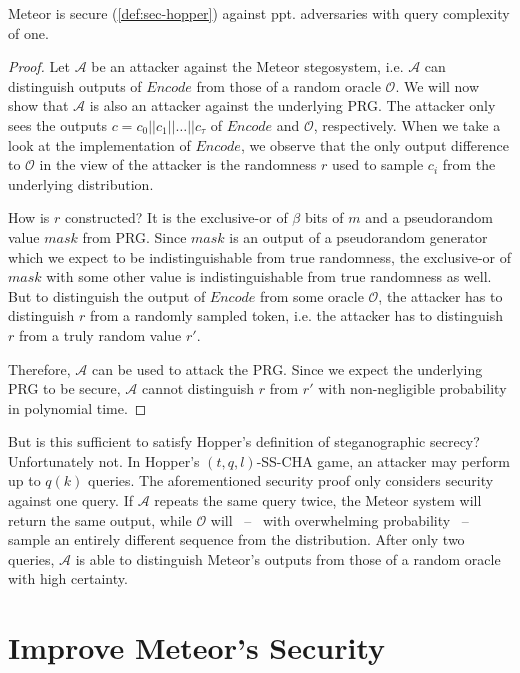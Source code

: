 \begin{theorem}
  Meteor is secure (\autoref{def:sec-hopper}) against ppt. adversaries with query complexity of one.
\label{thm:meteor-secure}
\end{theorem}
\begin{proof}
  Let $\mathcal{A}$ be an attacker against the Meteor stegosystem, i.e. $\mathcal{A}$ can distinguish outputs of $Encode$ from those of a random oracle $\mathcal{O}$. 
  We will now show that $\mathcal{A}$ is also an attacker against the underlying PRG.
  The attacker only sees the outputs $c = c_0 ||c_1 || \dots || c_{\tau}$ of $Encode$ and $\mathcal{O}$, respectively.
  When we take a look at the implementation of $Encode$, we observe that the only output difference to $\mathcal{O}$ in the view of the attacker is the randomness $r$ used to sample $c_i$ from the underlying distribution.
  
  
  How is $r$ constructed? 
  It is the exclusive-or of $\beta$ bits of $m$ and a pseudorandom value $mask$ from PRG.
  Since $mask$ is an output of a pseudorandom generator which we expect to be indistinguishable from true randomness, the exclusive-or of $mask$ with some other value is indistinguishable from true randomness as well.
  But to distinguish the output of $Encode$ from some oracle $\mathcal{O}$, the attacker has to distinguish $r$ from a randomly sampled token, i.e. the attacker has to distinguish $r$ from a truly random value $r'$.
  
  Therefore, $\mathcal{A}$ can be used to attack the PRG.
  Since we expect the underlying PRG to be secure, $\mathcal{A}$ cannot distinguish $r$ from $r'$ with non-negligible probability in polynomial time.
\end{proof}

But is this sufficient to satisfy Hopper's definition of steganographic secrecy?
Unfortunately not.
In Hopper's $(t,q,l)$-SS-CHA game, an attacker may perform up to $q(k)$ queries.
The aforementioned security proof only considers security against one query.
If $\mathcal{A}$ repeats the same query twice, the Meteor system will return the same output, while $\mathcal{O}$ will~ --~ with overwhelming probability~ --~ sample an entirely different sequence from the distribution.
After only two queries, $\mathcal{A}$ is able to distinguish Meteor's outputs from those of a random oracle with high certainty.


\section{Improve Meteor's Security}

